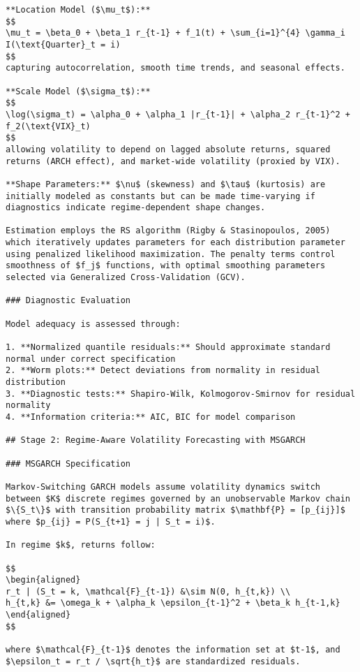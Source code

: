 \documentclass[
  10pt,
  a4paper,
]{article}
\begin{document}
\begin{tcolorbox}
\begin{verbatim}
**Location Model ($\mu_t$):** 
$$
\mu_t = \beta_0 + \beta_1 r_{t-1} + f_1(t) + \sum_{i=1}^{4} \gamma_i I(\text{Quarter}_t = i)
$$
capturing autocorrelation, smooth time trends, and seasonal effects.

**Scale Model ($\sigma_t$):** 
$$
\log(\sigma_t) = \alpha_0 + \alpha_1 |r_{t-1}| + \alpha_2 r_{t-1}^2 + f_2(\text{VIX}_t)
$$
allowing volatility to depend on lagged absolute returns, squared returns (ARCH effect), and market-wide volatility (proxied by VIX).

**Shape Parameters:** $\nu$ (skewness) and $\tau$ (kurtosis) are initially modeled as constants but can be made time-varying if diagnostics indicate regime-dependent shape changes.

Estimation employs the RS algorithm (Rigby & Stasinopoulos, 2005) which iteratively updates parameters for each distribution parameter using penalized likelihood maximization. The penalty terms control smoothness of $f_j$ functions, with optimal smoothing parameters selected via Generalized Cross-Validation (GCV).

### Diagnostic Evaluation

Model adequacy is assessed through:

1. **Normalized quantile residuals:** Should approximate standard normal under correct specification
2. **Worm plots:** Detect deviations from normality in residual distribution
3. **Diagnostic tests:** Shapiro-Wilk, Kolmogorov-Smirnov for residual normality
4. **Information criteria:** AIC, BIC for model comparison

## Stage 2: Regime-Aware Volatility Forecasting with MSGARCH

### MSGARCH Specification

Markov-Switching GARCH models assume volatility dynamics switch between $K$ discrete regimes governed by an unobservable Markov chain $\{S_t\}$ with transition probability matrix $\mathbf{P} = [p_{ij}]$ where $p_{ij} = P(S_{t+1} = j | S_t = i)$.

In regime $k$, returns follow:

$$
\begin{aligned}
r_t | (S_t = k, \mathcal{F}_{t-1}) &\sim N(0, h_{t,k}) \\
h_{t,k} &= \omega_k + \alpha_k \epsilon_{t-1}^2 + \beta_k h_{t-1,k}
\end{aligned}
$$

where $\mathcal{F}_{t-1}$ denotes the information set at $t-1$, and $\epsilon_t = r_t / \sqrt{h_t}$ are standardized residuals.


\end{verbatim}
\end{tcolorbox}
\end{document}
